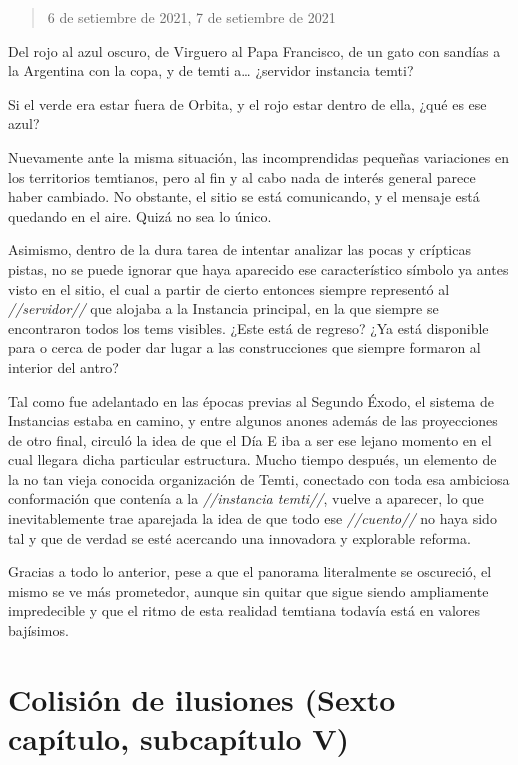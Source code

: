 \documentclass[
  spanish,
]{book}
\begin{document}
\begin{quote}
6 de setiembre de 2021, 7 de setiembre de 2021
\end{quote}

Del rojo al azul oscuro, de Virguero al Papa Francisco, de un gato con sandías a la Argentina con la copa, y de temti a\ldots{} ¿servidor instancia temti?

Si el verde era estar fuera de Orbita, y el rojo estar dentro de ella, ¿qué es ese azul?

Nuevamente ante la misma situación, las incomprendidas pequeñas variaciones en los territorios temtianos, pero al fin y al cabo nada de interés general parece haber cambiado. No obstante, el sitio se está comunicando, y el mensaje está quedando en el aire. Quizá no sea lo único.

Asimismo, dentro de la dura tarea de intentar analizar las pocas y crípticas pistas, no se puede ignorar que haya aparecido ese característico símbolo ya antes visto en el sitio, el cual a partir de cierto entonces siempre representó al \emph{//servidor//} que alojaba a la Instancia principal, en la que siempre se encontraron todos los tems visibles. ¿Este está de regreso? ¿Ya está disponible para o cerca de poder dar lugar a las construcciones que siempre formaron al interior del antro?

Tal como fue adelantado en las épocas previas al Segundo Éxodo, el sistema de Instancias estaba en camino, y entre algunos anones además de las proyecciones de otro final, circuló la idea de que el Día E iba a ser ese lejano momento en el cual llegara dicha particular estructura. Mucho tiempo después, un elemento de la no tan vieja conocida organización de Temti, conectado con toda esa ambiciosa conformación que contenía a la \emph{//instancia temti//}, vuelve a aparecer, lo que inevitablemente trae aparejada la idea de que todo ese \emph{//cuento//} no haya sido tal y que de verdad se esté acercando una innovadora y explorable reforma.

Gracias a todo lo anterior, pese a que el panorama literalmente se oscureció, el mismo se ve más prometedor, aunque sin quitar que sigue siendo ampliamente impredecible y que el ritmo de esta realidad temtiana todavía está en valores bajísimos.

\hypertarget{colisiuxf3n-de-ilusiones-sexto-capuxedtulo-subcapuxedtulo-v}{%
\section{Colisión de ilusiones (Sexto capítulo, subcapítulo V)}\label{colisiuxf3n-de-ilusiones-sexto-capuxedtulo-subcapuxedtulo-v}}
\end{document}
